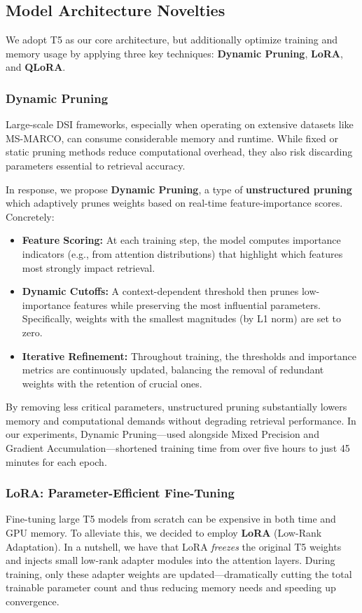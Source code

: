 \subsection{Model Architecture Novelties}

We adopt T5 as our core architecture, but additionally optimize training and memory usage by applying three key techniques: \textbf{Dynamic Pruning}, \textbf{LoRA}, and \textbf{QLoRA}.

\subsubsection{Dynamic Pruning}
Large-scale DSI frameworks, especially when operating on extensive datasets like MS-MARCO, can consume considerable memory and runtime. While fixed or static pruning methods reduce computational overhead, they also risk discarding parameters essential to retrieval accuracy.

In response, we propose \textbf{Dynamic Pruning}, a type of \textbf{unstructured pruning} which adaptively prunes weights based on real-time feature-importance scores. Concretely:
\begin{itemize}
    \item \textbf{Feature Scoring:} At each training step, the model computes importance indicators (e.g., from attention distributions) that highlight which features most strongly impact retrieval.
    \item \textbf{Dynamic Cutoffs:} A context-dependent threshold then prunes low-importance features while preserving the most influential parameters. Specifically, weights with the smallest magnitudes (by L1 norm) are set to zero.
    \item \textbf{Iterative Refinement:} Throughout training, the thresholds and importance metrics are continuously updated, balancing the removal of redundant weights with the retention of crucial ones.
\end{itemize}
By removing less critical parameters, unstructured pruning substantially lowers memory and computational demands without degrading retrieval performance. In our experiments, Dynamic Pruning—used alongside Mixed Precision and Gradient Accumulation—shortened training time from over five hours to just 45 minutes for each epoch.

\subsubsection{LoRA: Parameter-Efficient Fine-Tuning}
Fine-tuning large T5 models from scratch can be expensive in both time and GPU memory. To alleviate this, we decided to employ \textbf{LoRA} (Low-Rank Adaptation). In a nutshell, we have that LoRA \emph{freezes} the original T5 weights and injects small low-rank adapter modules into the attention layers. During training, only these adapter weights are updated—dramatically cutting the total trainable parameter count and thus reducing memory needs and speeding up convergence.

